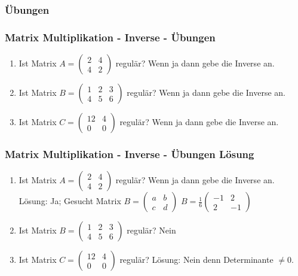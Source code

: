 \subsubsection{Übungen}
\begin{frame}
\frametitle{Matrix Multiplikation - Inverse - Übungen}
\begin{enumerate}
\item Ist Matrix $A = \begin{pmatrix} 2 & 4 \\ 4 & 2 \end{pmatrix}$ regulär? Wenn ja dann gebe die Inverse an.
\item Ist Matrix $B = \begin{pmatrix} 1 & 2 & 3 \\ 4 & 5 & 6 \end{pmatrix}$ regulär? Wenn ja dann gebe die Inverse an.
\item Ist Matrix $C = \begin{pmatrix} 12 & 4 \\ 0 & 0  \end{pmatrix}$ regulär? Wenn ja dann gebe die Inverse an.
\end{enumerate}
\end{frame}

\begin{frame}
\frametitle{Matrix Multiplikation - Inverse - Übungen Lösung}
\begin{enumerate}
\item Ist Matrix $A = \begin{pmatrix} 2 & 4 \\ 4 & 2 \end{pmatrix}$ regulär? Wenn ja dann gebe die Inverse an. \\
Lösung: Ja; Gesucht Matrix $B = \begin{pmatrix} a & b \\ c & d \end{pmatrix}$
$B = \frac{1}{6}\begin{pmatrix} -1 & 2 \\ 2 & -1 \end{pmatrix}$
\item Ist Matrix $B = \begin{pmatrix} 1 & 2 & 3 \\ 4 & 5 & 6 \end{pmatrix}$ regulär? Nein
\item  Ist Matrix $C = \begin{pmatrix} 12 & 4 \\ 0 & 0  \end{pmatrix}$ regulär?
Lösung: Nein denn Determinante $\neq 0$.
\end{enumerate}
\end{frame}



















